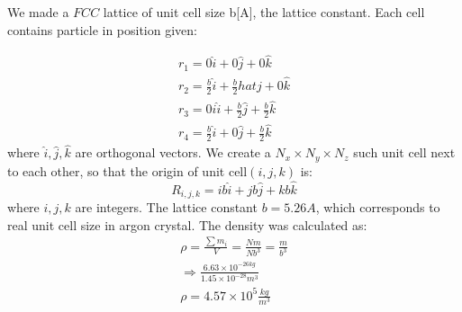 \documentclass[a4paper]{article}
\begin{document}
We made a $FCC$ lattice of unit cell size b[A], the lattice constant. Each cell contains particle in position given: 

\begin{align*}
r_1 = 0\hat{i} + 0\hat{j} + 0\hat{k} \\
r_2 = \frac{b}{2}\hat{i}  + \frac{b}{2}hat{j} + 0\hat{k} \\
r_3 = 0i\hat{i}  + \frac{b}{2}\hat{j} + \frac{b}{2}\hat{k} \\
r_4 = \frac{b}{2}\hat{i}  + 0\hat{j} + \frac{b}{2}\hat{k}
\end{align*}
 where $\hat{i} ,\hat{j},\hat{k}$ are orthogonal vectors. We create a $N_x \times N_y \times N_z$ such unit cell next to each other, so that the origin of unit cell$(i,j,k)$ is: 
 \begin{equation}
 R_{i,j,k} = ib\hat{i} + jb\hat{j} + kb\hat{k}
 \end{equation}
 where $i,j,k$ are integers. The lattice constant $b=5.26A$, which corresponds to real unit cell size in argon crystal. The density was calculated as:
 \begin{align*}
 \rho = \frac{\sum m_i}{V} = \frac{Nm}{Nb^3} = \frac{m}{b^3} \\
 \Rightarrow \frac{6.63\times 10^{-26kg}}{1.45 \times 10 ^{-28}m^3} \\
 \rho = 4.57 \times 10^5 \frac{kg}{m^3}
 \end{align*}
 
\end{document}

